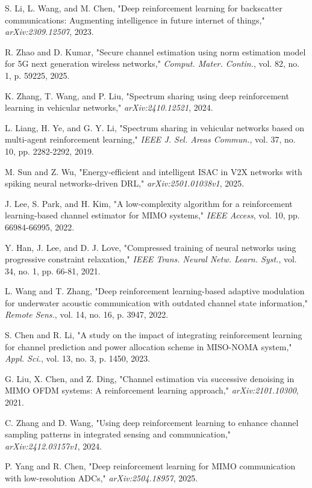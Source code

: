 \documentclass[journal,twocolumn]{IEEEtran}
\begin{document}
\begin{thebibliography}{20}
S. Li, L. Wang, and M. Chen, "Deep reinforcement learning for backscatter communications: Augmenting intelligence in future internet of things," \emph{arXiv:2309.12507}, 2023.

R. Zhao and D. Kumar, "Secure channel estimation using norm estimation model for 5G next generation wireless networks," \emph{Comput. Mater. Contin.}, vol. 82, no. 1, p. 59225, 2025.

K. Zhang, T. Wang, and P. Liu, "Spectrum sharing using deep reinforcement learning in vehicular networks," \emph{arXiv:2410.12521}, 2024.

L. Liang, H. Ye, and G. Y. Li, "Spectrum sharing in vehicular networks based on multi-agent reinforcement learning," \emph{IEEE J. Sel. Areas Commun.}, vol. 37, no. 10, pp. 2282-2292, 2019.

M. Sun and Z. Wu, "Energy-efficient and intelligent ISAC in V2X networks with spiking neural networks-driven DRL," \emph{arXiv:2501.01038v1}, 2025.

J. Lee, S. Park, and H. Kim, "A low-complexity algorithm for a reinforcement learning-based channel estimator for MIMO systems," \emph{IEEE Access}, vol. 10, pp. 66984-66995, 2022.

Y. Han, J. Lee, and D. J. Love, "Compressed training of neural networks using progressive constraint relaxation," \emph{IEEE Trans. Neural Netw. Learn. Syst.}, vol. 34, no. 1, pp. 66-81, 2021.

L. Wang and T. Zhang, "Deep reinforcement learning-based adaptive modulation for underwater acoustic communication with outdated channel state information," \emph{Remote Sens.}, vol. 14, no. 16, p. 3947, 2022.

S. Chen and R. Li, "A study on the impact of integrating reinforcement learning for channel prediction and power allocation scheme in MISO-NOMA system," \emph{Appl. Sci.}, vol. 13, no. 3, p. 1450, 2023.

G. Liu, X. Chen, and Z. Ding, "Channel estimation via successive denoising in MIMO OFDM systems: A reinforcement learning approach," \emph{arXiv:2101.10300}, 2021.

C. Zhang and D. Wang, "Using deep reinforcement learning to enhance channel sampling patterns in integrated sensing and communication," \emph{arXiv:2412.03157v1}, 2024.

P. Yang and R. Chen, "Deep reinforcement learning for MIMO communication with low-resolution ADCs," \emph{arXiv:2504.18957}, 2025.

\end{thebibliography}

\balance
\end{document}
